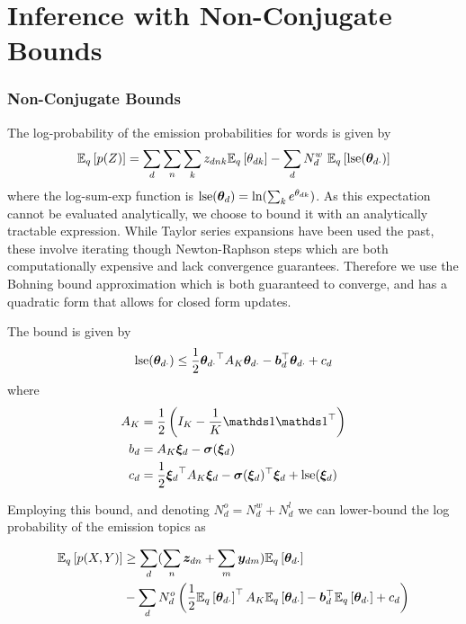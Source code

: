 \section{Inference with Non-Conjugate Bounds}
\subsubsection*{Non-Conjugate Bounds}
The log-probability of the emission probabilities for words is given by
\begin{align}
\ex{p(Z)}{q} = \sum_d \sum_n \sum_k \zdnk \ex{\thdk}{q} - \sum_d N^w_d \text{ }\ex{\lse(\thdo)}{q}
\end{align}
where the log-sum-exp function is $\lse(\thd) = \ln (\sum_k e^\thdk)$. As this expectation cannot be evaluated analytically, we choose to bound it with an analytically tractable expression. While Taylor series expansions have been used the past\cite{Blei2006}\cite{Wang2013a}, these involve iterating though Newton-Raphson steps which are both computationally expensive and lack convergence guarantees. Therefore we use the Bohning bound approximation\cite{Bohning1988} which is both guaranteed to converge, and has a quadratic form that allows for closed form updates.

The bound is given by
\begin{align}
\lse(\thdo) \leq \half \thdo\T A_K \thdo - \vv{b}_d\T\thdo + c_d \label{eqn:lse-def}
\end{align}
where
\begin{align}
A_K & = \half \left( I_K - \frac{1}{K} \one \one\T \right) \\
b_d & = A_K \Ed - \vv{\sigma}(\Ed) \label{eqn:bohning-b} \\
c_d & = \frac{1}{2} \Ed\T A_K \Ed - \vv{\sigma}(\Ed)\T\Ed + \lse(\Ed) \label{eqn:bohning-c}
\end{align}

Employing this bound, and denoting $N^o_d = N^w_d + N^l_d$ we can lower-bound the log probability of the emission topics as

\begin{equation}
\begin{aligned}
\ex{p(X,Y)}{q} & \geq \sum_d  (\sum_n \vv{z}_{dn} + \sum_m \vv{y}_{dm}) \ex{\thdo}{q} \\
   & - \sum_d N^o_d \left(\half \ex{\thdo}{q}\T A_K \ex{\thdo}{q} - \vv{b}_d\T\ex{\thdo}{q} + c_d\right)
\end{aligned}
\end{equation}


